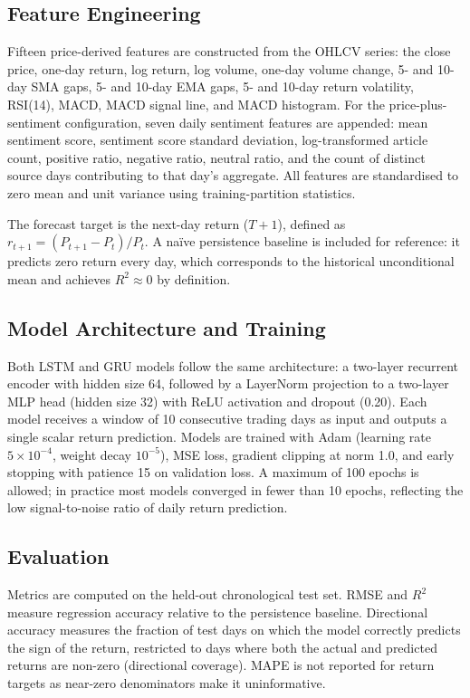 \documentclass[12pt]{ucetd}
\begin{document}
\subsection{Feature Engineering}

Fifteen price-derived features are constructed from the OHLCV series: the close price, one-day return, log return, log volume, one-day volume change, 5- and 10-day SMA gaps, 5- and 10-day EMA gaps, 5- and 10-day return volatility, RSI(14), MACD, MACD signal line, and MACD histogram. For the price-plus-sentiment configuration, seven daily sentiment features are appended: mean sentiment score, sentiment score standard deviation, log-transformed article count, positive ratio, negative ratio, neutral ratio, and the count of distinct source days contributing to that day's aggregate. All features are standardised to zero mean and unit variance using training-partition statistics.

The forecast target is the next-day return ($T{+}1$), defined as $r_{t+1} = (P_{t+1} - P_t) / P_t$. A na\"ive persistence baseline is included for reference: it predicts zero return every day, which corresponds to the historical unconditional mean and achieves $R^2 \approx 0$ by definition.

\subsection{Model Architecture and Training}

Both LSTM and GRU models follow the same architecture: a two-layer recurrent encoder with hidden size 64, followed by a LayerNorm projection to a two-layer MLP head (hidden size 32) with ReLU activation and dropout (0.20). Each model receives a window of 10 consecutive trading days as input and outputs a single scalar return prediction. Models are trained with Adam (learning rate $5 \times 10^{-4}$, weight decay $10^{-5}$), MSE loss, gradient clipping at norm 1.0, and early stopping with patience 15 on validation loss. A maximum of 100 epochs is allowed; in practice most models converged in fewer than 10 epochs, reflecting the low signal-to-noise ratio of daily return prediction.

\subsection{Evaluation}

Metrics are computed on the held-out chronological test set. RMSE and $R^2$ measure regression accuracy relative to the persistence baseline. Directional accuracy measures the fraction of test days on which the model correctly predicts the sign of the return, restricted to days where both the actual and predicted returns are non-zero (directional coverage). MAPE is not reported for return targets as near-zero denominators make it uninformative.
\end{document}

